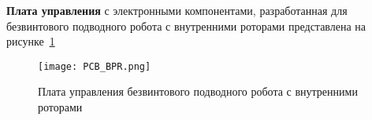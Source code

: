 \textbf{Плата управления} с электронными компонентами, разработанная для безвинтового подводного робота с внутренними роторами представлена на рисунке~\ref{PCB_BPR}

\begin{figure}[h!]
	\begin{center}
		\texttt{[image: PCB\_BPR.png]}
		\caption{Плата управления безвинтового подводного робота с внутренними роторами} \label{PCB_BPR}
	\end{center}
\end{figure}














\clearpage